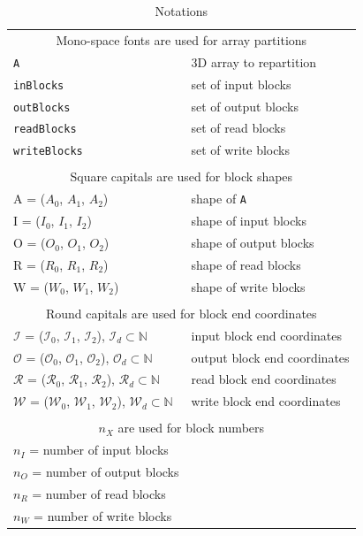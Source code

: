 \documentclass[sigconf, nonacm]{acmart}
\begin{document}
\begin{table}
  \caption{Notations}
  \begin{tabular}{ll}
    \multicolumn{2}{c}{\cellcolor{black!25}Mono-space fonts are used for array partitions}\\
    \texttt{A} & 3D array to repartition \\
    \texttt{inBlocks} & set of input blocks \\
    \texttt{outBlocks} & set of output blocks \\
    \texttt{readBlocks} & set of read blocks \\
    \texttt{writeBlocks} & set of write blocks \\

    &\\
    \multicolumn{2}{c}{\cellcolor{black!25}Square capitals are used for block shapes}\\
    A = ($A_0$, $A_1$, $A_2$) & shape of \texttt{A}\\
    I = ($I_0$, $I_1$, $I_2$)& shape of input blocks\\
    O = ($O_0$, $O_1$, $O_2$) & shape of output blocks\\
    R = ($R_0$, $R_1$, $R_2$) & shape of read blocks\\
    W = ($W_0$, $W_1$, $W_2$) & shape of write blocks\\
    &\\
    \multicolumn{2}{c}{\cellcolor{black!25}Round capitals are used for block end coordinates}\\

    $\mathcal{I}$ = ($\mathcal{I}_0$, $\mathcal{I}_1$, $\mathcal{I}_2$), \enskip $\mathcal{I}_d \subset \mathbb{N} $ & input block end coordinates \\
    $\mathcal{O}$ = ($\mathcal{O}_0$, $\mathcal{O}_1$, $\mathcal{O}_2$), \enskip $\mathcal{O}_d \subset \mathbb{N} $ & output block end coordinates\\
    $\mathcal{R}$ = ($\mathcal{R}_0$, $\mathcal{R}_1$, $\mathcal{R}_2$), \enskip $\mathcal{R}_d \subset \mathbb{N} $ & read block end coordinates\\
    $\mathcal{W}$ = ($\mathcal{W}_0$, $\mathcal{W}_1$, $\mathcal{W}_2$), \enskip $\mathcal{W}_d \subset \mathbb{N} $ & write block end coordinates\\
    &\\
    \multicolumn{2}{c}{\cellcolor{black!25}$n_X$ are used for block numbers}\\
    $n_I$ = number of input blocks\\
    $n_O$ = number of output blocks\\
    $n_R$ = number of read blocks\\
    $n_W$ = number of write blocks\\
  \end{tabular}
  \label{table:notations}
\end{table}
\end{document}
